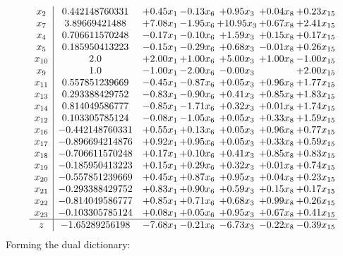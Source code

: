 \documentclass[8pt]{article}
\begin{document}
\[\begin{array}{c| c c@{\hskip 2pt} c@{\hskip 2pt} c@{\hskip 2pt} c@{\hskip 2pt} c@{\hskip 2pt} }
 x_{2}   &  0.442148760331 & +  0.45 x_{1} & -0.13 x_{6} & +  0.95 x_{3} & +  0.04 x_{8} & +  0.23 x_{15}\\
 x_{7}   &  3.89669421488 & +  7.08 x_{1} & -1.95 x_{6} & + 10.95 x_{3} & +  0.67 x_{8} & +  2.41 x_{15}\\
 x_{4}   &  0.706611570248 & -0.17 x_{1} & -0.10 x_{6} & +  1.59 x_{3} & +  0.15 x_{8} & +  0.17 x_{15}\\
 x_{5}   &  0.185950413223 & -0.15 x_{1} & -0.29 x_{6} & +  0.68 x_{3} & -0.01 x_{8} & +  0.26 x_{15}\\
 x_{10}   &  2.0 & +  2.00 x_{1} & +  1.00 x_{6} & +  5.00 x_{3} & +  1.00 x_{8} & -1.00 x_{15}\\
 x_{9}   &  1.0 & -1.00 x_{1} & -2.00 x_{6} & -0.00 x_{3} &   & +  2.00 x_{15}\\
 x_{11}   &  0.557851239669 & -0.45 x_{1} & -0.87 x_{6} & +  0.05 x_{3} & +  0.96 x_{8} & +  1.77 x_{15}\\
 x_{13}   &  0.293388429752 & -0.83 x_{1} & -0.90 x_{6} & +  0.41 x_{3} & +  0.85 x_{8} & +  1.83 x_{15}\\
 x_{14}   &  0.814049586777 & -0.85 x_{1} & -1.71 x_{6} & +  0.32 x_{3} & +  0.01 x_{8} & +  1.74 x_{15}\\
 x_{12}   &  0.103305785124 & -0.08 x_{1} & -1.05 x_{6} & +  0.05 x_{3} & +  0.33 x_{8} & +  1.59 x_{15}\\
 x_{16}   &  -0.442148760331 & +  0.55 x_{1} & +  0.13 x_{6} & +  0.05 x_{3} & +  0.96 x_{8} & +  0.77 x_{15}\\
 x_{17}   &  -0.896694214876 & +  0.92 x_{1} & +  0.95 x_{6} & +  0.05 x_{3} & +  0.33 x_{8} & +  0.59 x_{15}\\
 x_{18}   &  -0.706611570248 & +  0.17 x_{1} & +  0.10 x_{6} & +  0.41 x_{3} & +  0.85 x_{8} & +  0.83 x_{15}\\
 x_{19}   &  -0.185950413223 & +  0.15 x_{1} & +  0.29 x_{6} & +  0.32 x_{3} & +  0.01 x_{8} & +  0.74 x_{15}\\
 x_{20}   &  -0.557851239669 & +  0.45 x_{1} & +  0.87 x_{6} & +  0.95 x_{3} & +  0.04 x_{8} & +  0.23 x_{15}\\
 x_{21}   &  -0.293388429752 & +  0.83 x_{1} & +  0.90 x_{6} & +  0.59 x_{3} & +  0.15 x_{8} & +  0.17 x_{15}\\
 x_{22}   &  -0.814049586777 & +  0.85 x_{1} & +  0.71 x_{6} & +  0.68 x_{3} & +  0.99 x_{8} & +  0.26 x_{15}\\
 x_{23}   &  -0.103305785124 & +  0.08 x_{1} & +  0.05 x_{6} & +  0.95 x_{3} & +  0.67 x_{8} & +  0.41 x_{15}\\
\hline
z    &  -1.65289256198 & -7.68 x_{1} & -0.21 x_{6} & -6.73 x_{3} & -0.22 x_{8} & -0.39 x_{15}\\
\end{array}\]
Forming the dual dictionary:
\end{document}
